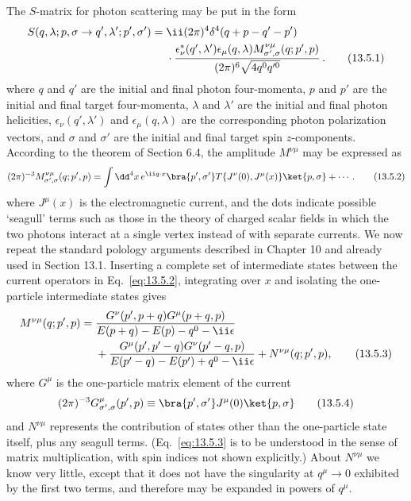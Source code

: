 The $S$-matrix for photon scattering may be put in the form
\begin{align}
S(q,\lambda;p,\sigma\to q',\lambda';p',\sigma')={}&\ii(2\pi)^4
\delta^4(q+p-q'-p')\notag\\
&\cdot\frac{\epsilon^*_{\nu}(q',\lambda')\epsilon_{\mu}(q,\lambda)
M^{\nu\mu}_{\sigma',\sigma}(q;p',p)}
{(2\pi)^6\sqrt{4q^0q'^0}}\,.
\tag{13.5.1}\label{eq:13.5.1}
\end{align}
where $q$ and $q'$ are the initial and final photon four-momenta, $p$ and $p'$
are the initial and final target four-momenta, $\lambda$ and $\lambda'$ are the initial and
final photon helicities, $\epsilon_\nu(q',\lambda')$ and $\epsilon_\mu(q,\lambda)$ are the corresponding photon
polarization vectors, and $\sigma$ and $\sigma'$ are the initial and final target spin
$z$-components. According to the theorem of Section 6.4, the amplitude
$M^{\nu\mu}$ may be expressed as
\begin{equation}
(2\pi)^{-3}M^{\nu\mu}_{\sigma',\sigma}(q;p',p)
=\int \dd^4x\,e^{\ii q\cdot x}
\bra{p',\sigma'}T\{J^\nu(0),J^\mu(x)\}\ket{p,\sigma}+\cdots.
\tag{13.5.2}\label{eq:13.5.2}
\end{equation}
where $J^\mu(x)$ is the electromagnetic current, and the dots indicate possible
`seagull' terms such as those in the theory of charged scalar fields in
which the two photons interact at a single vertex instead of with separate
currents. We now repeat the standard polology arguments described
in Chapter 10 and already used in Section 13.1. Inserting a complete
set of intermediate states between the current operators in Eq.~\eqref{eq:13.5.2},
integrating over $x$ and isolating the one-particle intermediate states gives
\begin{align}
M^{\nu\mu}(q;p',p)={}&
\frac{G^\nu(p',p+q)G^\mu(p+q,p)}
{E(p+q)-E(p)-q^0-\ii\epsilon}\notag\\
&+\frac{G^\mu(p',p'-q)G^\nu(p'-q,p)}
{E(p'-q)-E(p')+q^0-\ii\epsilon}
+N^{\nu\mu}(q;p',p),
\tag{13.5.3}\label{eq:13.5.3}
\end{align}
where $G^\mu$ is the one-particle matrix element of the current
\begin{equation}
(2\pi)^{-3}G^\mu_{\sigma',\sigma}(p',p)
\equiv\bra{p',\sigma'}J^\mu(0)\ket{p,\sigma}
\tag{13.5.4}\label{eq:13.5.4}
\end{equation}
and $N^{\nu\mu}$ represents the contribution of states other than the one-particle
state itself, plus any seagull terms. (Eq.~\eqref{eq:13.5.3} is to be understood in
the sense of matrix multiplication, with spin indices not shown explicitly.)
About $N^{\nu\mu}$ we know very little, except that it does not have the singularity
at $q^\mu\to0$ exhibited by the first two terms, and therefore may be expanded
in powers of $q^\mu$.

